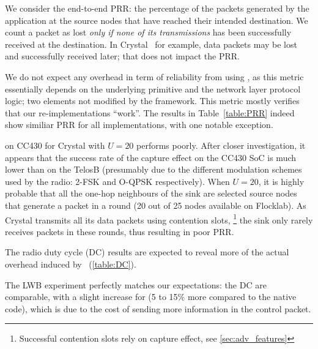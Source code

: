 We consider the end-to-end PRR: the percentage of the packets generated by the application at the source nodes that have reached their intended destination.
We count a packet as lost \textsl{only if none of its transmissions} has been successfully received at the destination. In Crystal~\cite{istomin2018Interferenceresilient} for example, data packets may be lost and successfully received later; that does not impact the PRR.

We do not expect any overhead in term of reliability from using \baloo, as this metric essentially depends on the underlying \ST primitive and the network layer protocol logic; two elements not modified by the framework.
This metric mostly verifies that our re-implementations ``work''.
The results in Table~\ref{table:PRR} indeed show similiar PRR for all implementations, with one notable exception.

\baloo on CC430 for Crystal with $U=20$ performs poorly. After closer investigation, it appears that the success rate of the capture effect on the CC430 SoC is much lower than on the TelosB (presumably due to the different modulation schemes used by the radio: 2-FSK and O-QPSK respectively).
When $U=20$, it is highly probable that all the one-hop neighbours of the sink are selected source nodes that generate a packet in a round (20 out of 25 nodes available on Flocklab).
As Crystal transmits all its data packets using contention slots,%
\footnote{Successful contention slots rely on capture effect, see \cref{sec:adv_features}}
the sink only rarely receives packets in these rounds, thus resulting in poor PRR.

The radio duty cycle (DC) results are expected to reveal more of the actual overhead induced by \baloo~(\cref{table:DC}).

The LWB experiment perfectly matches our expectations: the DC are comparable, with a slight increase for \baloo (5 to 15\% more compared to the native code), which is due to the cost of sending more information in the control packet.


